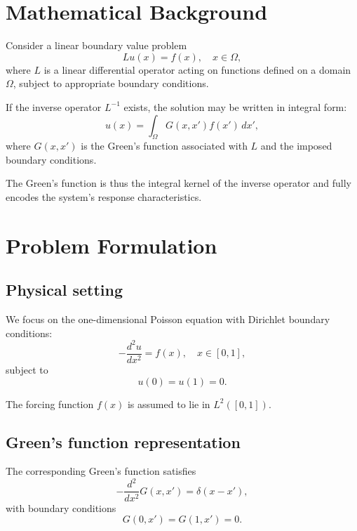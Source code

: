\documentclass[11pt]{article}
\begin{document}
\section{Mathematical Background}

Consider a linear boundary value problem
\begin{equation}
L u(x) = f(x), \quad x \in \Omega,
\end{equation}
where $L$ is a linear differential operator acting on functions defined on a domain
$\Omega$, subject to appropriate boundary conditions.

If the inverse operator $L^{-1}$ exists, the solution may be written in integral form:
\begin{equation}
u(x) = \int_\Omega G(x,x') f(x') \, dx',
\end{equation}
where $G(x,x')$ is the Green's function associated with $L$ and the imposed boundary
conditions.

The Green's function is thus the integral kernel of the inverse operator and fully
encodes the system's response characteristics.

\section{Problem Formulation}

\subsection{Physical setting}

We focus on the one-dimensional Poisson equation with Dirichlet boundary conditions:
\begin{equation}
-\frac{d^2 u}{dx^2} = f(x), \quad x \in [0,1],
\end{equation}
subject to
\begin{equation}
u(0) = u(1) = 0.
\end{equation}

The forcing function $f(x)$ is assumed to lie in $L^2([0,1])$.

\subsection{Green's function representation}

The corresponding Green's function satisfies
\begin{equation}
-\frac{d^2}{dx^2} G(x,x') = \delta(x-x'),
\end{equation}
with boundary conditions
\begin{equation}
G(0,x') = G(1,x') = 0.
\end{equation}
\end{document}

